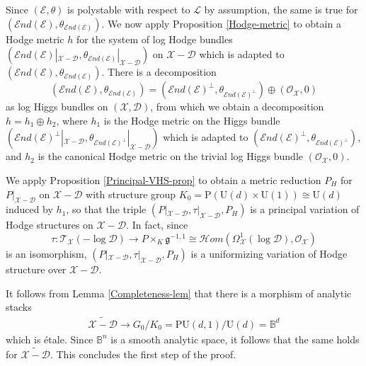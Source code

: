 \documentclass[a4paper]{amsart}
\theoremstyle{definition}
\begin{document}
Since $(\mathcal{E},\theta)$ is polystable with respect to $\mathcal{L}$ by assumption, the same is true for $(\mathcal{E}nd(\mathcal{E}),\theta_{\mathcal{E}nd(\mathcal{E})})$. We now apply Proposition \ref{Hodge-metric} to obtain a Hodge metric $h$ for the system of log Hodge bundles $(\mathcal{E}nd(\mathcal{E})|_{\mathscr{X}-\mathscr{D}},\theta_{\mathcal{E}nd(\mathcal{E})}|_{\mathscr{X}-\mathscr{D}})$ on $\mathscr{X}-\mathscr{D}$ which is adapted to $(\mathcal{E}nd(\mathcal{E}),\theta_{\mathcal{E}nd(\mathcal{E})})$. There is a decomposition 
\[
(\mathcal{E}nd(\mathcal{E}),\theta_{\mathcal{E}nd(\mathcal{E})})=(\mathcal{E}nd(\mathcal{E})^\perp,\theta_{\mathcal{E}nd(\mathcal{E})^\perp})\oplus(\mathcal{O}_{\mathscr{X}},0)
\] 
as log Higgs bundles on $(\mathscr{X},\mathscr{D})$, from which we obtain a decomposition $h=h_1\oplus h_2$, where $h_1$ is the Hodge metric on the Higgs bundle $(\mathcal{E}nd(\mathcal{E})^\perp|_{\mathscr{X}-\mathscr{D}},\theta_{\mathcal{E}nd(\mathcal{E})^\perp}|_{\mathscr{X}-\mathscr{D}})$ which is adapted to $(\mathcal{E}nd(\mathcal{E})^\perp,\theta_{\mathcal{E}nd(\mathcal{E})^\perp})$, and $h_2$ is the canonical Hodge metric on the trivial log Higgs bundle $(\mathcal{O}_{\mathscr{X}},0)$. 

We apply Proposition \ref{Principal-VHS-prop} to obtain a metric reduction $P_H$ for $P|_{\mathscr{X}-\mathscr{D}}$ on $\mathscr{X}-\mathscr{D}$ with structure group $K_0=\mathrm{P}(\mathrm{U}(d)\times\mathrm{U}(1))\cong\mathrm{U}(d)$ induced by $h_1$, so that the triple $(P|_{\mathscr{X}-\mathscr{D}},\tau|_{\mathscr{X}-\mathscr{D}},P_H)$ is a principal variation of Hodge structures on $\mathscr{X}-\mathscr{D}$. In fact, since
\[
\tau:\mathcal{T}_{\mathscr{X}}(-\log \mathscr{D})\to P\times_K\mathfrak{g}^{-1,1}\cong\mathcal{H}om(\Omega^1_{\mathscr{X}}(\log \mathscr{D}),\mathcal{O}_{\mathscr{X}})
\]
is an isomorphism, $(P|_{\mathscr{X}-\mathscr{D}},\tau|_{\mathscr{X}-\mathscr{D}},P_H)$ is a uniformizing variation of Hodge structure over $\mathscr{X}-\mathscr{D}$.

It follows from Lemma \ref{Completeness-lem} that there is a morphism of analytic stacks
\begin{align}\label{Local-biholo}
\widetilde{\mathscr{X}-\mathscr{D}}\to G_0/K_0=\mathrm{PU}(d,1)/\mathrm{U}(d)=\mathbb{B}^d
\end{align}
which is \'etale. Since $\mathbb{B}^n$ is a smooth analytic space, it follows that the same holds for $\widetilde{\mathscr{X}-\mathscr{D}}$. This concludes the first step of the proof.
\end{document}

